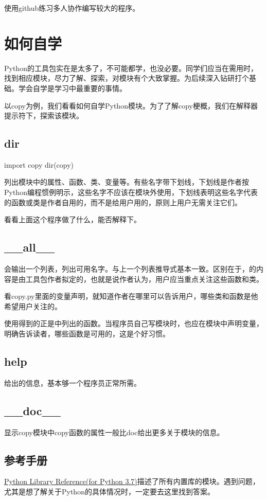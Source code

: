 使用github练习多人协作编写较大的程序。

\section{如何自学}
Python的工具包实在是太多了，不可能都学，也没必要。同学们应当在需用时，找到相应模块，尽力了解、探索，对模块有个大致掌握。为后续深入钻研打个基础。学会自学是学习中最重要的事情。

以copy为例，我们看看如何自学Python模块。为了了解copy梗概，我们在解释器提示符下，探索该模块。
\subsection{dir}
\begin{python}
import copy
dir(copy)  
\end{python}
列出模块中的属性、函数、类、变量等。有些名字带下划线，下划线是作者按Python编程惯例明示，这些名字不应该在模块外使用，下划线表明这些名字代表的函数或类是作者自用的，而不是给用户用的，原则上用户无需关注它们。
\begin{python}
\end{python}
看看上面这个程序做了什么，能否解释下。
\subsection{\_\_all\_\_}
会输出一个列表，列出可用名字。与上一个列表推导式基本一致。区别在于，的内容是由工具包作者拟定的，也就是说作者认为，用户应当重点关注这些函数和类。

看copy.py里面的变量声明，就知道作者在哪里可以告诉用户，哪些类和函数是他希望用户关注的。

使用得到的正是中列出的函数。当程序员自己写模块时，也应在模块中声明变量，明确告诉读者，哪些函数是可用的，这是个好习惯。
\subsection{help}
给出的信息，基本够一个程序员正常所需。
\subsection{\_\_doc\_\_}
显示copy模块中copy函数的属性一般比doc给出更多关于模块的信息。
\subsection{参考手册}
\href{https://docs.python.org/3.7/library/index.html}{Python Library Reference(for Python 3.7)}描述了所有内置库的模块。遇到问题，尤其是想了解关于Python的具体情况时，一定要去这里找到答案。
